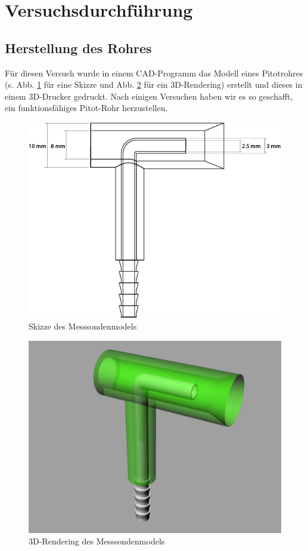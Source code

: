 \section{Versuchsdurchführung}
\subsection{Herstellung des Rohres}
Für diesen Versuch wurde in einem CAD-Programm das Modell eines Pitotrohres (s. Abb. \ref{skizze-ks} für eine Skizze und Abb. \ref{render-ks} für ein 3D-Rendering) erstellt und dieses in einem 3D-Drucker gedruckt. Nach einigen Versuchen haben wir es so geschafft, ein funktionsfähiges Pitot-Rohr herzustellen.
\begin{figure}
\centering
	\includegraphics[width=.8\textwidth]{images/ks-zeichnung.png}
	\caption{Skizze des Messsondenmodels}
	\label{skizze-ks}
\end{figure}
\begin{figure}
\centering
	\includegraphics[width=.8\textwidth]{images/ks-render.png}
	\caption{3D-Rendering des Messsondenmodels}
	\label{render-ks}
\end{figure}
